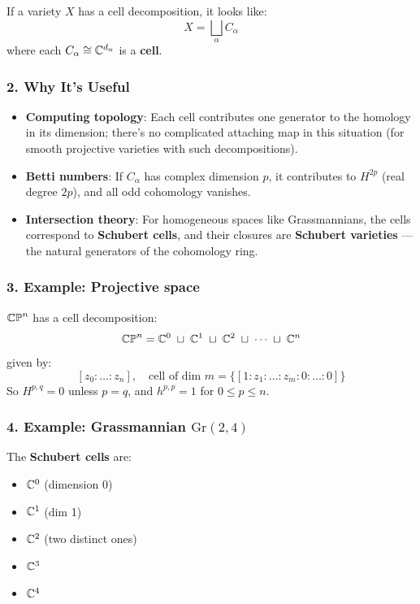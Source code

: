 \documentclass{amsart}
\let\originalmathbb\mathbb
\renewcommand{\mathbb}[1]{%
    \ifstrequal{#1}{1}{\mathbbm{#1}}{\originalmathbb{#1}}%
}
\theoremstyle{plain}
\theoremstyle{definition}
\theoremstyle{remark}
\begin{document}
If a variety $X$ has a cell decomposition, it looks like:
\[
X = \bigsqcup_{\alpha} C_\alpha
\]
where each $C_\alpha \cong \mathbb{C}^{d_\alpha}$ is a \textbf{cell}.

\subsubsection{2. \textbf{Why It’s Useful}}

\begin{itemize}
	\item \textbf{Computing topology}:
Each cell contributes one generator to the homology in its dimension; there’s no complicated attaching map in this situation (for smooth projective varieties with such decompositions).
	\item \textbf{Betti numbers}:
If $C_\alpha$ has complex dimension $p$, it contributes to $H^{2p}$ (real degree $2p$), and all odd cohomology vanishes.
	\item \textbf{Intersection theory}:
For homogeneous spaces like Grassmannians, the cells correspond to \textbf{Schubert cells}, and their closures are \textbf{Schubert varieties} — the natural generators of the cohomology ring.
\end{itemize}

\subsubsection{3. \textbf{Example: Projective space}}

$\mathbb{CP}^n$ has a cell decomposition:
\[
\mathbb{CP}^n = \mathbb{C}^0 \;\sqcup\; \mathbb{C}^1 \;\sqcup\; \mathbb{C}^2 \;\sqcup\; \cdots \;\sqcup\; \mathbb{C}^n
\]
given by:
\[
[z_0: \dots : z_n], \quad \text{cell of dim }m = \{ [1: z_1 : \dots : z_m : 0 : \dots : 0] \}
\]
So $H^{p,q}=0$ unless $p=q$, and $h^{p,p}=1$ for $0 \le p \le n$.

\subsubsection{4. \textbf{Example: Grassmannian \texorpdfstring{$\mathrm{Gr}(2,4)$}{Gr(2,4)}}}

The \textbf{Schubert cells} are:

\begin{itemize}
	\item $\mathbb{C}^0$ (dimension 0)
	\item $\mathbb{C}^1$ (dim 1)
	\item $\mathbb{C}^2$ (two distinct ones)
	\item $\mathbb{C}^3$
	\item $\mathbb{C}^4$
\end{itemize}
\end{document}

